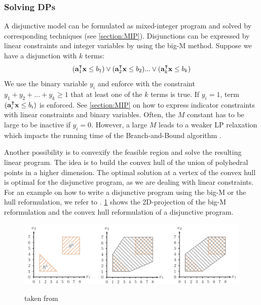 \subsubsection*{Solving DPs}  \label{section:solving_dps}
A disjunctive model can be formulated as mixed-integer program and solved by corresponding techniques (see \cref{section:MIP}). Disjunctions can be expressed by linear constraints and integer variables by using the big-M method. Suppose we have a disjunction with $k$ terms:
\begin{equation*}
    (\bold a_1^\intercal \bold x \leq b_1) \lor (\bold a_2^\intercal \bold x \leq b_2) ... \lor (\bold a_k^\intercal \bold x \leq b_k)
\end{equation*}
We use the binary variable $y_i$ and enforce with the constraint $y_1 +  y_2 + ... + y_k \geq 1$ that at least one of the $k$ terms is true. If $y_i=1$, term $(\bold a_i^\intercal \bold x \leq b_i)$ is enforced. See \cref{section:MIP} on how to express indicator constraints with linear constraints and binary variables. Often, the $M$ constant has to be large to be inactive if $y_i=0$. However, a large $M$ leads to a weaker LP relaxation which impacts the running time of the Branch-and-Bound algorithm \cite{aps_mosek_nodate}. 

Another possibility is to convexify the feasible region and solve the resulting linear program. The idea is to build the convex hull of the union of polyhedral points in a higher dimension. The optimal solution at a vertex of the convex hull is optimal for the disjunctive program, as we are dealing with linear constraints. %
For an example on how to write a disjunctive program using the big-M or the hull reformulation, we refer to \cite{perez_disjunctiveprogrammingjl_2023}.
\cref{fig:dp_solving_techniques} shows the 2D-projection of the big-M reformulation and the convex hull reformulation of a disjunctive program. 

\begin{figure}[h!]
    \caption{taken from \cite{hutchison_automating_2010}}
    \centering
    \includegraphics[width=1.0\textwidth]{Images/dp_solving_techniques.png}
    \label{fig:dp_solving_techniques}
\end{figure}

